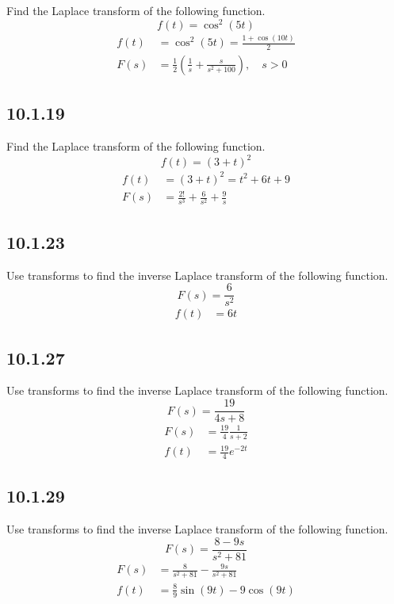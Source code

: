 \documentclass{article}
\begin{document}
Find the Laplace transform of the following function.
\begin{equation*}
	f(t) = \cos^2(5t)
\end{equation*}
\begin{align*}
	f(t) & = \cos^2(5t) = \frac{ 1 + \cos(10t) }{ 2 } \\
	F(s) & = \frac{1}{2} \left( \frac{1}{s} + \frac{s}{s^2 + 100} \right), \quad s > 0
\end{align*}

\subsection{10.1.19}

Find the Laplace transform of the following function.
\begin{equation*}
	f(t) = (3 + t)^2
\end{equation*}
\begin{align*}
	f(t) & = (3 + t)^2 = t^2 + 6t + 9 \\
	F(s) & = \frac{2!}{s^{3}} + \frac{6}{s^2} + \frac{9}{s}
\end{align*}

\subsection{10.1.23}
Use transforms to find the inverse Laplace transform of the following function.
\begin{equation*}
	F(s) = \frac{6}{s^2}
\end{equation*}
\begin{align*}
	f(t) & = 6t
\end{align*}

\subsection{10.1.27}
Use transforms to find the inverse Laplace transform of the following function.
\begin{equation*}
	F(s) = \frac{19}{4s + 8}
\end{equation*}
\begin{align*}
	F(s) & = \frac{19}{4}\frac{1}{s + 2} \\
	f(t) & = \frac{19}{4}e^{-2t}
\end{align*}

\subsection{10.1.29}
Use transforms to find the inverse Laplace transform of the following function.
\begin{equation*}
	F(s) = \frac{8 - 9s}{s^2 + 81}
\end{equation*}
\begin{align*}
	F(s) & = \frac{8}{s^2 + 81} - \frac{9s}{s^2 + 81} \\
	f(t) & = \frac{8}{9}\sin(9t) - 9\cos(9t)
\end{align*}
\end{document}
